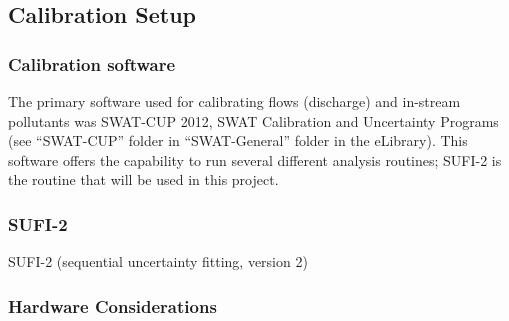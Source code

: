 \subsection{Calibration Setup}
	\subsubsection{Calibration software}
The primary software used for calibrating flows (discharge) and in-stream
pollutants was SWAT-CUP 2012, SWAT Calibration and Uncertainty Programs (see
``SWAT-CUP'' folder in ``SWAT-General'' folder in the e\textunderscore Library).
This software offers the capability to run several different analysis routines;
SUFI-2 is the routine that will be used in this project.
	
	\subsubsection{SUFI-2}
SUFI-2 (sequential uncertainty fitting, version 2)
	  
	\subsubsection{Hardware Considerations}
\pagebreak